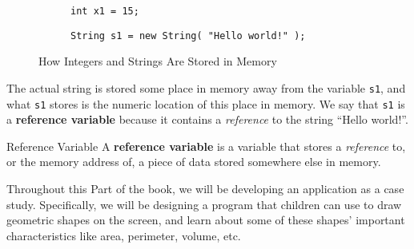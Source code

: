 \begin{figure}[ht]
    \begin{center}
        \sffamily
        \begin{subfigure}{0.2\textwidth}
            \begin{center}
        \end{center}
            \caption{\texttt{int x1 = 15;}}
        \end{subfigure}%
        \begin{subfigure}{0.4\textwidth}
            \begin{center}
            \end{center}
            \caption{\texttt{String s1 = new String( "Hello world!" );}}
        \end{subfigure}
    \end{center}
    \caption{How Integers and Strings Are Stored in Memory}
    \label{fig:reference-variable}
\end{figure}

The actual string is stored some place in memory away from the variable \texttt{s1}, and what \texttt{s1} stores is the numeric location of this place in memory.  We say that \texttt{s1} is a \textbf{reference variable} because it contains a \textit{reference} to the string ``Hello world!''.

\begin{defn}{Reference Variable}
    A \textbf{reference variable} is a variable that stores a \textit{reference} to, or the memory address of, a piece of data stored somewhere else in memory.
\end{defn}

Throughout this Part of the book, we will be developing an application as a case study.  Specifically, we will be designing a program that children can use to draw geometric shapes on the screen, and learn about some of these shapes' important characteristics like area, perimeter, volume, etc.
